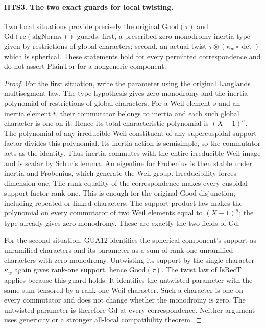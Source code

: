 \documentclass[11pt,a4paper]{article}
\numberwithin{equation}{section}
\theoremstyle{remark}\newtheorem{remark}[theorem]{Remark}
\begin{document}
\paragraph{HTS3. The two exact guards for local twisting.}
\label{claim:HTS3}
Two local situations provide precisely the original
$\mathrm{Good}(\tau)$ and $\mathrm{Gd}(\mathrm{rc}(\mathrm{algNorm}\tau))$
guards: first, a prescribed zero-monodromy inertia type given by
restrictions of global characters; second, an actual twist
$\tau\otimes(\kappa_w\circ\det)$ which is spherical.
These statements hold for every permitted correspondence and
do not assert $\mathrm{PlainTor}$ for a nongeneric component.
\begin{proof}
For the first situation, write the parameter using the original
Langlands multisegment law.  The type hypothesis gives zero
monodromy and the inertia polynomial of restrictions of global
characters.  For a Weil element $s$ and an inertia element $t$,
their commutator belongs to inertia and each such global character
is one on it.  Hence its total characteristic polynomial is
$(X-1)^n$.  The polynomial of any irreducible Weil constituent
of any supercuspidal support factor divides this polynomial.
Its inertia action is semisimple, so the commutator acts as the
identity.  Thus inertia commutes with the entire irreducible
Weil image and is scalar by Schur's lemma.  An eigenline for
Frobenius is then stable under inertia and Frobenius, which
generate the Weil group.  Irreducibility forces dimension one.
The rank equality of the correspondence makes every cuspidal
support factor rank one.  This is enough for the original
$\mathrm{Good}$ disjunction, including repeated or linked
characters.  The support product law makes the polynomial on
every commutator of two Weil elements equal to $(X-1)^n$;
the type already gives zero monodromy.  These are exactly
the two fields of $\mathrm{Gd}$.

For the second situation, GUA12 identifies the spherical
component's support as unramified characters and its parameter
as a sum of rank-one unramified characters with zero monodromy.
Untwisting its support by the single character $\kappa_w$
again gives rank-one support, hence $\mathrm{Good}(\tau)$.
The twist law of $\mathrm{IsRecT}$ applies because this guard
holds.  It identifies the untwisted parameter with the same
sum tensored by a rank-one Weil character.  Such a character
is one on every commutator and does not change whether the
monodromy is zero.  The untwisted parameter is therefore
$\mathrm{Gd}$ at every correspondence.  Neither argument
uses genericity or a stronger all-local compatibility theorem.
\end{proof}
\end{document}
